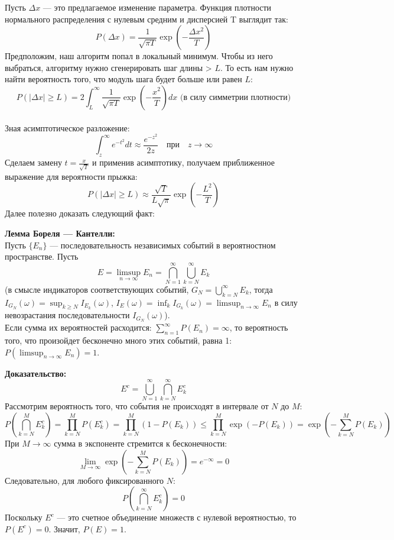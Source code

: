\noindent Пусть $\Delta x$ — это предлагаемое изменение параметра. Функция плотности нормального распределения с нулевым средним и дисперсией T выглядит так:$$P(\Delta x) = \frac{1}{\sqrt{\pi T}} \exp\left(-\frac{\Delta x^2}{T}\right)$$
Предположим, наш алгоритм попал в локальный минимум. Чтобы из него выбраться, алгоритму нужно сгенерировать шаг длины > $L$. То есть нам нужно найти вероятность того, что модуль шага будет больше или равен $L$:$$P(|\Delta x| \ge L) = 2 \int_{L}^{\infty} \frac{1}{\sqrt{\pi T}} \exp\left(-\frac{x^2}{T}\right) dx \text{ (в силу симметрии плотности)}$$  \\
Зная асимптотическое разложение: $$\int_{z}^{\infty} e^{-t^2} dt \approx \frac{e^{-z^2}}{2z} \quad \text{при} \quad z \to \infty$$
Сделаем замену $t = \frac{x}{\sqrt{T}}$ и применив асимптотику, получаем приближенное выражение для вероятности прыжка:$$P(|\Delta x| \ge L) \approx \frac{\sqrt{T}}{L \sqrt{\pi}} \exp\left(-\frac{L^2}{T}\right)$$
Далее полезно доказать следующий факт: 
\begin{tcolorbox}[colback=gray!5!white, colframe=gray!75!black]
\textbf{Лемма Бореля — Кантелли:} \\
Пусть $\{E_n\}$ — последовательность независимых событий в вероятностном пространстве. Пусть $$E = \limsup_{n \to \infty} E_n = \bigcap_{N=1}^{\infty} \bigcup_{k=N}^{\infty} E_k$$
(в смысле индикаторов соответствующих событий, $G_N = \bigcup_{k=N}^{\infty} E_k$, тогда $I_{G_N}(\omega) = \sup_{k \ge N} I_{E_k}(\omega)$, $I_E(\omega) = \inf_{k}I_{G_{k}}(\omega) = \limsup_{n \to \infty} E_n$ в силу невозрастания последовательности $I_{G_N}(\omega)$). \\
Если сумма их вероятностей расходится: $\displaystyle \sum_{n=1}^{\infty} P(E_n) = \infty$, то вероятность того, что произойдет бесконечно много этих событий, равна 1: $P(\limsup_{n \to \infty} E_n) = 1$.
\end{tcolorbox}
\textbf{Доказательство:} \\
$$E^c = \bigcup_{N=1}^{\infty} \bigcap_{k=N}^{\infty} E_k^c$$
Рассмотрим вероятность того, что события не происходят в интервале от $N$ до $M$:$$P\left( \bigcap_{k=N}^{M} E_k^c \right) = \prod_{k=N}^{M} P(E_k^c) = \prod_{k=N}^{M} (1 - P(E_k)) \le \prod_{k=N}^{M} \exp(-P(E_k)) = \exp\left( -\sum_{k=N}^{M} P(E_k) \right)$$ 
При $M \to \infty$ сумма в экспоненте стремится к бесконечности: $$\lim_{M \to \infty} \exp\left( -\sum_{k=N}^{M} P(E_k) \right) = e^{-\infty} = 0$$
Следовательно, для любого фиксированного $N$:$$P\left( \bigcap_{k=N}^{\infty} E_k^c \right) = 0$$
Поскольку $E^c$ — это счетное объединение множеств с нулевой вероятностью, то $P(E^c) = 0$. Значит, $P(E) = 1$. \\
